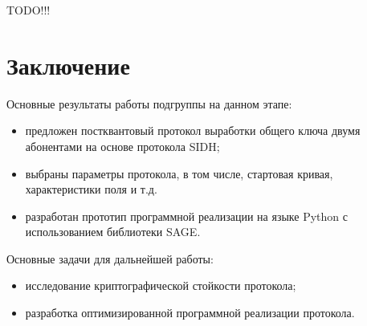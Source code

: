 \documentclass[a4paper,12pt]{article}
\theoremstyle{definition}
\begin{document}
TODO!!!

\section*{Заключение}

Основные результаты работы подгруппы на данном этапе:

\begin{itemize}
 \item  предложен постквантовый протокол выработки общего ключа двумя абонентами на основе протокола SIDH;

 \item  выбраны параметры протокола, в том числе, стартовая кривая, характеристики поля и т.д.

 \item  разработан прототип программной реализации на языке Python с использованием библиотеки SAGE.
\end{itemize}


Основные задачи для дальнейшей работы:
\begin{itemize}

 \item  исследование криптографической стойкости протокола;

 \item  разработка оптимизированной программной реализации протокола.
\end{itemize}

\newpage
\end{document}
